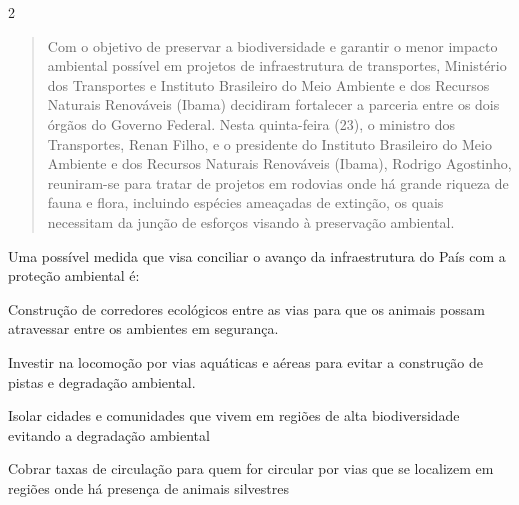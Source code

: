 {{\num{2}
\begin{quote}
Com o objetivo de preservar a biodiversidade e garantir o menor
impacto ambiental possível em projetos de infraestrutura de
transportes, Ministério dos Transportes e Instituto Brasileiro do Meio
Ambiente e dos Recursos Naturais Renováveis (Ibama) decidiram
fortalecer a parceria entre os dois órgãos do Governo Federal. Nesta
quinta-feira (23), o ministro dos Transportes, Renan Filho, e o
presidente do Instituto Brasileiro do Meio Ambiente e dos Recursos
Naturais Renováveis (Ibama), Rodrigo Agostinho, reuniram-se para
tratar de projetos em rodovias onde há grande riqueza de fauna e
flora, incluindo espécies ameaçadas de extinção, os quais necessitam
da junção de esforços visando à preservação ambiental.

\end{quote}

Uma possível medida que visa conciliar o avanço da infraestrutura do
País com a proteção ambiental é:

\begin{escolha}
\item
  Construção de corredores ecológicos entre as vias para que os animais
  possam atravessar entre os ambientes em segurança.
\item
  Investir na locomoção por vias aquáticas e aéreas para evitar a
  construção de pistas e degradação ambiental.
\item
  Isolar cidades e comunidades que vivem em regiões de alta
  biodiversidade evitando a degradação ambiental
\item
  Cobrar taxas de circulação para quem for circular por vias que se
  localizem em regiões onde há presença de animais silvestres
\end{escolha}


}}
